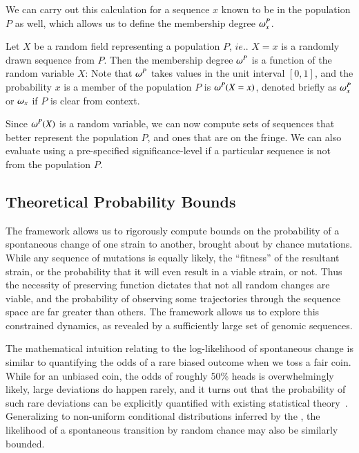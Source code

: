 {We can carry out this calculation for a sequence $x$  known to be in the population $P$ as well, which allows us to define the membership degree $\omega^P_x$.
\begin{defn}
Let $X$ be a random field representing a population $P$, $ie.$. $X=x$ is a randomly drawn sequence from $P$. Then  the membership degree $\omega^P$ is  a function of the random variable $X$: 
Note that $\omega^P$ takes values in the unit interval $[0,1]$, and the probability  $x$ is a member of the population $P$ is $\omega^P(X=x)$, denoted briefly as $\omega_{x}^P$ or $\omega_{x}$ if $P$ is clear from context.
\end{defn}
Since $\omega^P(X)$ is a random variable, we can now compute sets of sequences that better represent the population $P$, and ones that are on the fringe. We can also evaluate using a pre-specified significance-level if a particular sequence is not from the population $P$.



\subsection*{Theoretical Probability Bounds}

The \enet framework  allows us to rigorously compute bounds on the probability of a spontaneous change of one strain to another, brought about by chance mutations. While any sequence of mutations is equally likely, the ``fitness'' of the resultant strain, or the probability that it will even result in a viable strain, or not. Thus the necessity of preserving  function  dictates that not all random changes  are viable, and the probability of observing some trajectories through the sequence space  are far greater  than others. The \enet framework allows us to explore this constrained dynamics, as revealed by a sufficiently large set of genomic sequences.



The mathematical intuition  relating  \qdist  to the log-likelihood of spontaneous change  is similar to quantifying the  odds of  a rare biased outcome when we  toss a fair coin.
While for an unbiased coin, the odds of roughly 50\% heads is overwhelmingly likely, large deviations do happen rarely, and it turns out that the probability of such rare deviations can be explicitly quantified with existing statistical theory~\cite{varadhan2010large}.
 Generalizing to non-uniform conditional distributions inferred by the \enet, the likelihood of a spontaneous transition  by random chance may also be similarly bounded.


}
